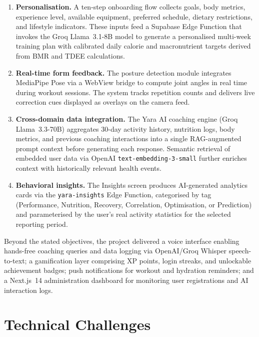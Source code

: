 \begin{enumerate}
	\item \textbf{Personalisation.} A ten-step onboarding flow collects
	goals, body metrics, experience level, available equipment, preferred
	schedule, dietary restrictions, and lifestyle indicators. These inputs
	feed a Supabase Edge Function that invokes the Groq Llama~3.1-8B
	model to generate a personalised multi-week training plan with
	calibrated daily calorie and macronutrient targets derived from BMR
	and TDEE calculations.
	
	\item \textbf{Real-time form feedback.} The posture detection module
	integrates MediaPipe Pose via a WebView bridge to compute joint angles
	in real time during workout sessions. The system tracks repetition
	counts and delivers live correction cues displayed as overlays on the
	camera feed.
	
	\item \textbf{Cross-domain data integration.} The Yara AI coaching
	engine (Groq Llama~3.3-70B) aggregates 30-day activity history,
	nutrition logs, body metrics, and previous coaching interactions into
	a single RAG-augmented prompt context before generating each response.
	Semantic retrieval of embedded user data via OpenAI
	\texttt{text-embedding-3-small} further enriches context with
	historically relevant health events.
	
	\item \textbf{Behavioral insights.} The Insights screen produces
	AI-generated analytics cards via the \texttt{yara-insights} Edge
	Function, categorised by tag (Performance, Nutrition, Recovery,
	Correlation, Optimisation, or Prediction) and parameterised by the
	user's real activity statistics for the selected reporting period.
\end{enumerate}

Beyond the stated objectives, the project delivered a voice interface
enabling hands-free coaching queries and data logging via OpenAI/Groq
Whisper speech-to-text; a gamification layer comprising XP points, login
streaks, and unlockable achievement badges; push notifications for workout
and hydration reminders; and a Next.js~14 administration dashboard for
monitoring user registrations and AI interaction logs.

\section{Technical Challenges}

